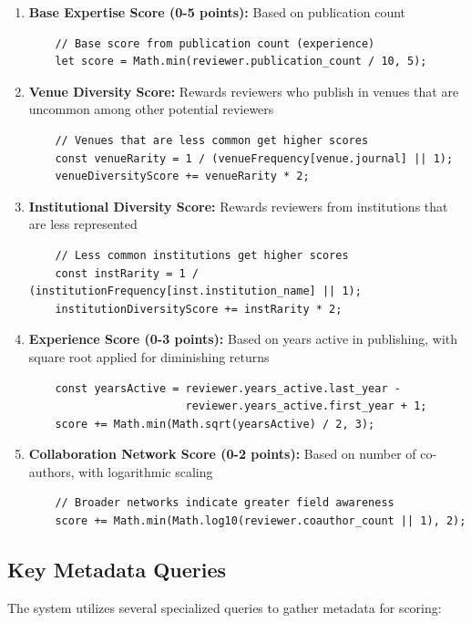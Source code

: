 \begin{enumerate}
    \item \textbf{Base Expertise Score (0-5 points):} Based on publication count
    \begin{verbatim}
    // Base score from publication count (experience)
    let score = Math.min(reviewer.publication_count / 10, 5);
    \end{verbatim}
    
    \item \textbf{Venue Diversity Score:} Rewards reviewers who publish in venues that are uncommon among other potential reviewers
    \begin{verbatim}
    // Venues that are less common get higher scores
    const venueRarity = 1 / (venueFrequency[venue.journal] || 1);
    venueDiversityScore += venueRarity * 2;
    \end{verbatim}
    
    \item \textbf{Institutional Diversity Score:} Rewards reviewers from institutions that are less represented
    \begin{verbatim}
    // Less common institutions get higher scores
    const instRarity = 1 / (institutionFrequency[inst.institution_name] || 1);
    institutionDiversityScore += instRarity * 2;
    \end{verbatim}
    
    \item \textbf{Experience Score (0-3 points):} Based on years active in publishing, with square root applied for diminishing returns
    \begin{verbatim}
    const yearsActive = reviewer.years_active.last_year - 
                        reviewer.years_active.first_year + 1;
    score += Math.min(Math.sqrt(yearsActive) / 2, 3);
    \end{verbatim}
    
    \item \textbf{Collaboration Network Score (0-2 points):} Based on number of co-authors, with logarithmic scaling
    \begin{verbatim}
    // Broader networks indicate greater field awareness
    score += Math.min(Math.log10(reviewer.coauthor_count || 1), 2);
    \end{verbatim}
\end{enumerate}

\subsection{Key Metadata Queries}
The system utilizes several specialized queries to gather metadata for scoring:

